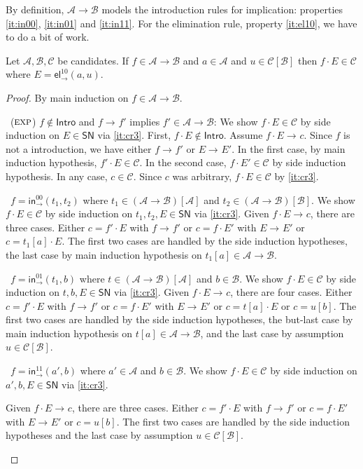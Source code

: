 \documentclass[a4paper,USenglish,cleveref, autoref, thm-restate]{lipics-v2021}
\newenvironment{caselist}{%
  \begin{list}{{\it Case}}{%
  }%
}{\end{list}%
}
\newcommand{\nextcase}{\item~}
\newcommand{\rulename}[1]{\ensuremath{\mbox{\textsc{#1}}}\xspace}
\newcommand{\rexp}{\rulename{exp}}
\newcommand{\tin}{\ensuremath{\mathsf{in}}}
\newcommand{\inn}[2]{\ensuremath{\tin_{#1}^{#2}}}
\newcommand{\tel}{\mathsf{el}}
\newcommand{\el}[2]{\ensuremath{\tel_{#1}^{#2}}}
\newcommand{\red}[1][]{\longrightarrow_{#1}}
\newcommand{\A}{\mathcal{A}}
\newcommand{\B}{\mathcal{B}}
\newcommand{\C}{\mathcal{C}}
\newcommand{\SN}{\mathsf{SN}}
\newcommand{\Intro}{\mathsf{Intro}}
\newcommand{\ind}[1]{}    %
\newcommand{\indp}[2]{#1} %
\begin{document}
By definition, $\A \to \B$ models the introduction rules for
implication:
properties \ref{it:in00}, \ref{it:in01} and \ref{it:in11}.
For the elimination rule, property \ref{it:el10}, we have to do a bit of work.
\begin{lemma}
  \label{lem:app}
  Let $\A,\B,\C$ be candidates.
  If $f \in \indp{\A \to \B}{\Gamma}$ and $a \in \A\ind\Gamma$ and
  $u \in \C[\B]\ind\Gamma$ then $f \cdot E \in \C$
  where $E = \el\to{10}(a,u)$.
\end{lemma}
\begin{proof}
  By main induction on $f \in \indp{\A \to \B}{\Gamma}$.
  \begin{caselist}

    \nextcase (\rexp) $f \not\in \Intro$ and $f \red f'$ implies
    $f' \in \indp{\A \to \B}{\Gamma}$:
    We show $f \cdot E \in \C$ by side induction on $E \in \SN$ via \ref{it:cr3}.
    First, $f \cdot E \not\in\Intro$.
    Assume $f \cdot E \red c$.  Since $f$ is not a introduction, we
    have either $f \red f'$ or $E \red E'$.  In the first case, by
    main induction hypothesis, $f' \cdot E \in \C$.
    In the second case, $f \cdot E' \in \C$ by side induction hypothesis.
    In any case, $c \in \C$.  Since $c$ was arbitrary, $f \cdot E \in
    \C$ by \ref{it:cr3}.

    \nextcase $f = \inn\to{00}(t_1,t_2)$ where
    $t_1 \in (\A \to \B)[\A]\ind\Gamma$ and
    $t_2 \in (\A \to \B)[\B]\ind\Gamma$.
    We show $f \cdot E \in \C$ by side induction on $t_1,t_2,E \in
    \SN$ via \ref{it:cr3}.
    Given $f \cdot E \red c$, there are three cases.  Either $c = f' \cdot
    E$ with $f \red f'$ or $c = f \cdot E'$ with $E \red E'$ or $c =
    t_1[a] \cdot E$.  The first two cases are handled by the side
    induction hypotheses, the last case by main induction hypothesis
    on $t_1[a] \in \indp{\A \to \B}{\Gamma}$.

    \nextcase $f = \inn\to{01}(t_1,b)$ where
    $t \in (\A \to \B)[\A]\ind\Gamma$ and
    $b \in \B\ind\Gamma$.
    We show $f \cdot E \in \C$ by side induction on $t,b,E \in
    \SN$ via \ref{it:cr3}.
    Given $f \cdot E \red c$, there are four cases.  Either $c = f' \cdot
    E$ with $f \red f'$ or $c = f \cdot E'$ with $E \red E'$ or $c =
    t[a] \cdot E$ or $c = u[b]$.  The first two cases are handled by the side
    induction hypotheses, the but-last case by main induction hypothesis
    on $t[a] \in \indp{\A \to \B}{\Gamma}$, and the last case by assumption
    $u \in \C[\B]\ind\Gamma$.

    \nextcase $f = \inn\to{11}(a',b)$ where
    $a' \in \A\ind\Gamma$ and
    $b \in \B\ind\Gamma$.
    We show $f \cdot E \in \C$ by side induction on $a',b,E \in
    \SN$ via \ref{it:cr3}.

    Given $f \cdot E \red c$, there are three cases.  Either
    $c = f' \cdot E$ with $f \red f'$ or $c = f \cdot E'$ with
    $E \red E'$ or $c = u[b]$.  The first two cases are handled by the
    side induction hypotheses and the last case by
    assumption $u \in \C[\B]\ind\Gamma$.
  \popQED
  \end{caselist}
\end{proof}
\end{document}
